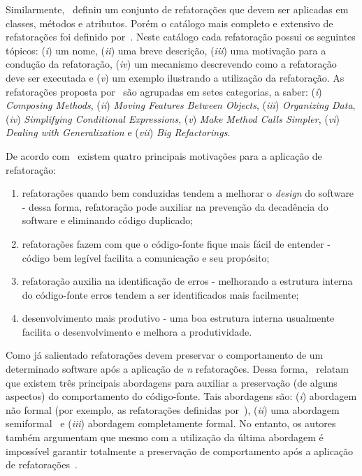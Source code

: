 Similarmente,~ definiu um conjunto de refatorações que devem ser aplicadas em classes, métodos e atributos. Porém o catálogo mais completo e extensivo de refatorações foi definido por~. Neste catálogo cada refatoração possui os seguintes tópicos: (\textit{i}) um nome, (\textit{ii}) uma breve descrição, (\textit{iii}) uma motivação para a condução da refatoração, (\textit{iv}) um mecanismo descrevendo como a refatoração deve ser executada e (\textit{v}) um exemplo ilustrando a utilização da refatoração. As refatorações proposta por~ são agrupadas em setes categorias, a saber: (\textit{i}) \textit{Composing Methods}, (\textit{ii}) \textit{Moving Features Between Objects}, (\textit{iii}) \textit{Organizing Data}, (\textit{iv}) \textit{Simplifying Conditional Expressions}, (\textit{v}) \textit{Make Method Calls Simpler}, (\textit{vi}) \textit{Dealing with Generalization} e (\textit{vii}) \textit{Big Refactorings}.

De acordo com~ existem quatro principais motivações para a aplicação de refatoração:

\begin{enumerate}
	\item refatorações quando bem conduzidas tendem a melhorar o \textit{design} do software - dessa forma, refatoração pode auxiliar na prevenção da decadência do software e eliminando código duplicado;
	\item refatorações fazem com que o código-fonte fique mais fácil de entender - código bem legível facilita a comunicação e seu propósito;
	\item refatoração auxilia na identificação de erros - melhorando a estrutura interna do código-fonte erros tendem a ser identificados mais facilmente;
	\item desenvolvimento mais produtivo - uma boa estrutura interna usualmente facilita o desenvolvimento e melhora a produtividade.
\end{enumerate}

Como já salientado refatorações devem preservar o comportamento de um determinado software após a aplicação de \textit{n} refatorações. Dessa forma,~ relatam que existem três principais abordagens para auxiliar a preservação (de alguns aspectos) do comportamento do código-fonte. Tais abordagens são: (\textit{i}) abordagem não formal (por exemplo, as refatorações definidas por~), (\textit{ii}) uma abordagem semiformal~\cite{Roberts_1999} e (\textit{iii}) abordagem completamente formal. No entanto, os autores também argumentam que mesmo com a utilização da última abordagem é impossível garantir totalmente a preservação de comportamento após a aplicação de refatorações~\cite{Mens04,Cinneide_2000}. 

